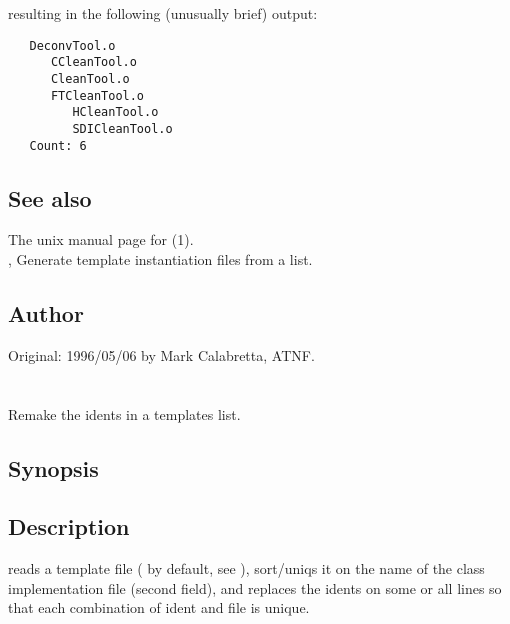 \noindent
resulting in the following (unusually brief) output:

\begin{verbatim}
   DeconvTool.o
      CCleanTool.o
      CleanTool.o
      FTCleanTool.o
         HCleanTool.o
         SDICleanTool.o
   Count: 6
\end{verbatim}

\subsection*{See also}
 
The unix manual page for (1).\\
, Generate template instantiation files from a list.
 
\subsection*{Author}

Original: 1996/05/06 by Mark Calabretta, ATNF.

 
\newpage
\section{}
\label{reident}
 
Remake the idents in a templates list.

\subsection*{Synopsis}
 
\begin{synopsis}
\end{synopsis}
 
\subsection*{Description}

 reads a template file ( by default, see
), sort/uniqs it on the name of the class implementation
 file (second field), and replaces the idents on some or all lines
so that each combination of ident and  file is unique.


